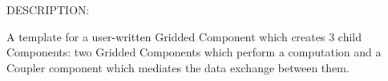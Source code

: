  
\setlength{\oldparskip}{\parskip}
\setlength{\parskip}{1.5ex}
\setlength{\oldparindent}{\parindent}
\setlength{\parindent}{0pt}
\setlength{\oldbaselineskip}{\baselineskip}
\setlength{\baselineskip}{11pt}
 
\def\bv{\begin{verbatim}}
\def\ev{\end{verbatim}}
\def\be{\begin{equation}}
\def\ee{\end{equation}}
\def\bea{\begin{eqnarray}}
\def\eea{\end{eqnarray}}
\def\bi{\begin{itemize}}
\def\ei{\end{itemize}}
\def\bn{\begin{enumerate}}
\def\en{\end{enumerate}}
\def\bd{\begin{description}}
\def\ed{\end{description}}
\def\({\left (}
\def\){\right )}
\def\[{\left [}
\def\]{\right ]}
\def\<{\left  \langle}
\def\>{\right \rangle}
\def\cI{{\cal I}}
\def\diag{\mathop{\rm diag}}
\def\tr{\mathop{\rm tr}}


 

  
{\sf DESCRIPTION:\\ }


    A template for a user-written Gridded Component which creates 3 child
    Components:
    two Gridded Components which perform a computation and a Coupler component
    which mediates the data exchange between them.
  
